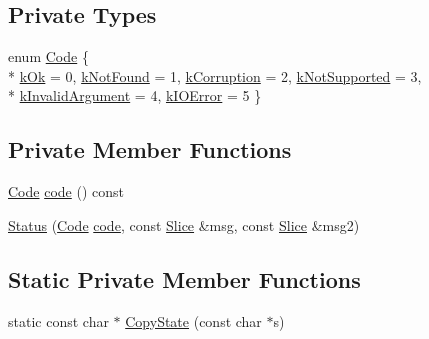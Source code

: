 \subsection*{Private Types}
\begin{DoxyCompactItemize}
\item 
enum \hyperlink{classleveldb_1_1_status_a86ca3f4adce279a55ac09d2b1595f79e}{Code} \{ \\*
\hyperlink{classleveldb_1_1_status_a86ca3f4adce279a55ac09d2b1595f79ea4c54273a0fbd51290eae80d9cc80117a}{k\+Ok} = 0, 
\hyperlink{classleveldb_1_1_status_a86ca3f4adce279a55ac09d2b1595f79ea87edd90692a671b10c26be30e9b72fa1}{k\+Not\+Found} = 1, 
\hyperlink{classleveldb_1_1_status_a86ca3f4adce279a55ac09d2b1595f79eadaf0012d73a1227ac1becd24f9fe2bde}{k\+Corruption} = 2, 
\hyperlink{classleveldb_1_1_status_a86ca3f4adce279a55ac09d2b1595f79ea4e89a938069aed11621b189d48794ccc}{k\+Not\+Supported} = 3, 
\\*
\hyperlink{classleveldb_1_1_status_a86ca3f4adce279a55ac09d2b1595f79ea6f372f89cd74535fc2c3656d7d491d79}{k\+Invalid\+Argument} = 4, 
\hyperlink{classleveldb_1_1_status_a86ca3f4adce279a55ac09d2b1595f79eaaf6bab40c7a93f4f947177f605f0a1ba}{k\+I\+O\+Error} = 5
 \}
\end{DoxyCompactItemize}
\subsection*{Private Member Functions}
\begin{DoxyCompactItemize}
\item 
\hyperlink{classleveldb_1_1_status_a86ca3f4adce279a55ac09d2b1595f79e}{Code} \hyperlink{classleveldb_1_1_status_a7e1c5239636c9e0ffff6df6144f32af3}{code} () const 
\item 
\hyperlink{classleveldb_1_1_status_a84bf55896b6ed85828c75ce0ceffc19e}{Status} (\hyperlink{classleveldb_1_1_status_a86ca3f4adce279a55ac09d2b1595f79e}{Code} \hyperlink{classleveldb_1_1_status_a7e1c5239636c9e0ffff6df6144f32af3}{code}, const \hyperlink{classleveldb_1_1_slice}{Slice} \&msg, const \hyperlink{classleveldb_1_1_slice}{Slice} \&msg2)
\end{DoxyCompactItemize}
\subsection*{Static Private Member Functions}
\begin{DoxyCompactItemize}
\item 
static const char $\ast$ \hyperlink{classleveldb_1_1_status_a8ba9034a426f8bfaf7f9f94fcf534a3a}{Copy\+State} (const char $\ast$s)
\end{DoxyCompactItemize}
